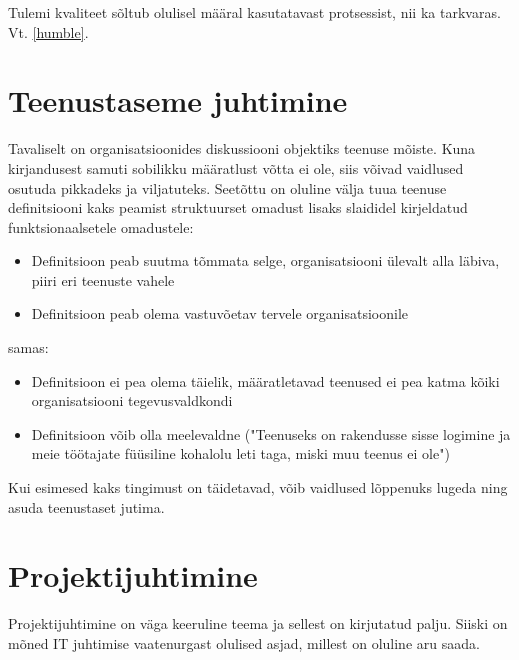 \documentclass{tufte-book}
\begin{document}
Tulemi kvaliteet sõltub olulisel määral kasutatavast protsessist, nii ka tarkvaras. Vt. \ref{humble}.

\section{Teenustaseme juhtimine}
Tavaliselt on organisatsioonides diskussiooni objektiks teenuse mõiste. Kuna kirjandusest samuti sobilikku määratlust võtta ei ole, siis võivad vaidlused osutuda pikkadeks ja viljatuteks. Seetõttu on oluline välja tuua teenuse definitsiooni kaks peamist struktuurset omadust lisaks slaididel kirjeldatud funktsionaalsetele omadustele:
\begin{itemize}
	\item Definitsioon peab suutma tõmmata selge, organisatsiooni ülevalt alla läbiva, piiri eri teenuste vahele
	\item Definitsioon peab olema vastuvõetav tervele organisatsioonile
\end{itemize}

samas:
\begin{itemize}
	\item Definitsioon ei pea olema täielik, määratletavad teenused ei pea katma kõiki organisatsiooni tegevusvaldkondi
	\item Definitsioon võib olla meelevaldne ("Teenuseks on rakendusse sisse logimine ja meie töötajate füüsiline kohalolu leti taga, miski muu teenus ei ole")
\end{itemize}

Kui esimesed kaks tingimust on täidetavad, võib vaidlused lõppenuks lugeda ning asuda teenustaset jutima.

\section{Projektijuhtimine}
Projektijuhtimine on väga keeruline teema ja sellest on kirjutatud palju. Siiski on mõned IT juhtimise vaatenurgast olulised asjad, millest on oluline aru saada. 
\end{document}
